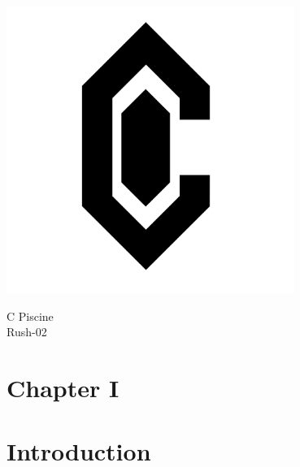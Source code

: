 \documentclass[12pt]{article}
\begin{document}
\begin{center}
  \includegraphics[width=0.7\textwidth]{logo-back.png}

  \vspace{1cm}

  \begin{center}
    \Huge C Piscine \\
    \LARGE Rush-02 \\
  \end{center}
\end{center}

\newpage
\tableofcontents
\newpage

\section*{\LARGE Chapter I}
\section*{\LARGE Introduction}
\end{document}
